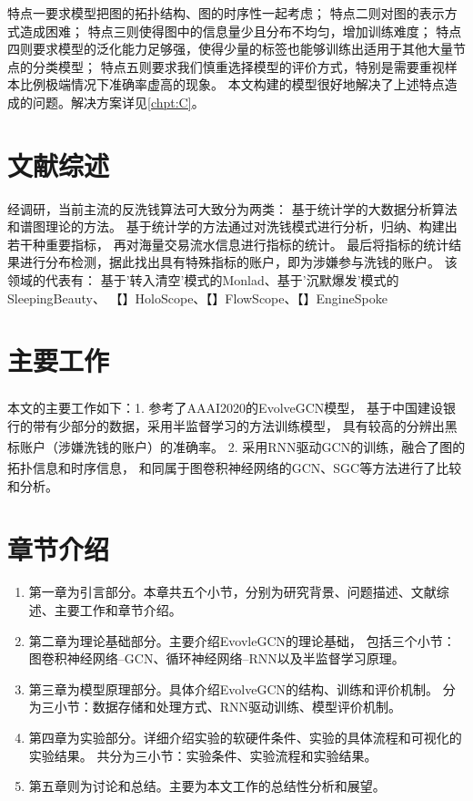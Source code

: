   特点一要求模型把图的拓扑结构、图的时序性一起考虑；
  特点二则对图的表示方式造成困难；
  特点三则使得图中的信息量少且分布不均匀，增加训练难度；
  特点四则要求模型的泛化能力足够强，使得少量的标签也能够训练出适用于其他大量节点的分类模型；
  特点五则要求我们慎重选择模型的评价方式，特别是需要重视样本比例极端情况下准确率虚高的现象。
  本文构建的模型很好地解决了上述特点造成的问题。解决方案详见\ref{chpt:C}。
  \section{文献综述}
  经调研，当前主流的反洗钱算法可大致分为两类：
  基于统计学的大数据分析算法和谱图理论的方法。
  基于统计学的方法通过对洗钱模式进行分析，归纳、构建出若干种重要指标，
  再对海量交易流水信息进行指标的统计。
  最后将指标的统计结果进行分布检测，据此找出具有特殊指标的账户，即为涉嫌参与洗钱的账户。
  该领域的代表有：
  基于'转入清空'模式的Monlad、基于'沉默爆发'模式的SleepingBeauty、
  【】HoloScope、【】FlowScope、【】EngineSpoke

  \section{主要工作}
  本文的主要工作如下：1. 参考了AAAI2020的EvolveGCN模型\textsuperscript{\cite{Evolvegcn}}，
  基于中国建设银行的带有少部分的数据，采用半监督学习的方法训练模型，
  具有较高的分辨出黑标账户（涉嫌洗钱的账户）的准确率。
  2. 采用RNN\textsuperscript{\cite{GRU}}驱动GCN的训练，融合了图的拓扑信息和时序信息，
  和同属于图卷积神经网络的GCN\textsuperscript{\cite{kipfGCN}}、SGC\textsuperscript{\cite{SGC}}等方法进行了比较和分析。
  
  \section{章节介绍}
  \begin{enumerate}
    \item 第一章为引言部分。本章共五个小节，分别为研究背景、问题描述、文献综述、主要工作和章节介绍。
    \item 第二章为理论基础部分。主要介绍EvovleGCN的理论基础，
    包括三个小节：图卷积神经网络--GCN、循环神经网络--RNN以及半监督学习原理。
    \item 第三章为模型原理部分。具体介绍EvolveGCN的结构、训练和评价机制。
    分为三小节：数据存储和处理方式、RNN驱动训练、模型评价机制。
    \item 第四章为实验部分。详细介绍实验的软硬件条件、实验的具体流程和可视化的实验结果。
    共分为三小节：实验条件、实验流程和实验结果。
    \item 第五章则为讨论和总结。主要为本文工作的总结性分析和展望。
  \end{enumerate}

